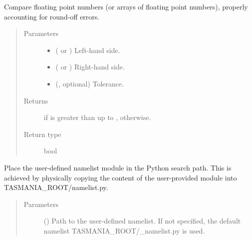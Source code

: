 \documentclass[letterpaper,10pt,english]{sphinxmanual}
\begin{document}
\begin{fulllineitems}
\label{\detokenize{api:utils.utils.greater_than}}
Compare floating point numbers (or arrays of floating point numbers), properly accounting for round-off errors.
\begin{quote}\begin{description}
\item[{Parameters}] \leavevmode\begin{itemize}
\item {} 
 ( or ) \textendash{} Left-hand side.

\item {} 
 ( or ) \textendash{} Right-hand side.

\item {} 
 (, optional) \textendash{} Tolerance.

\end{itemize}

\item[{Returns}] \leavevmode
{} if  is greater than  up to ,  otherwise.

\item[{Return type}] \leavevmode
bool

\end{description}\end{quote}

\end{fulllineitems}


\begin{fulllineitems}
\label{\detokenize{api:utils.utils.set_namelist}}
Place the user-defined namelist module in the Python search path.
This is achieved by physically copying the content of the user-provided module into TASMANIA\_ROOT/namelist.py.
\begin{quote}\begin{description}
\item[{Parameters}] \leavevmode
{} () \textendash{} Path to the user-defined namelist. If not specified, the default namelist TASMANIA\_ROOT/\_namelist.py is used.

\end{description}\end{quote}

\end{fulllineitems}
\end{document}
